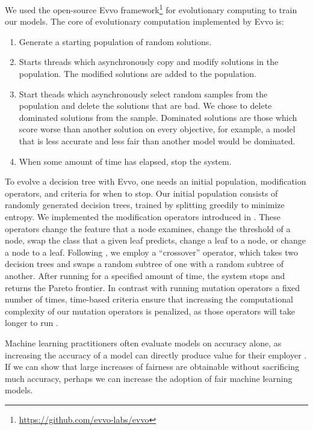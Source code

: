 \documentclass{elsarticle}
\begin{document}
We used the open-source Evvo framework\footnote{\href{https://github.com/evvo-labs/evvo}{https://github.com/evvo-labs/evvo}} for evolutionary computing to train our models. The core of evolutionary computation implemented by Evvo is:
\begin{enumerate}
	\item Generate a starting population of random solutions.
	\item Starts threads which asynchronously copy and modify solutions in the population. The modified solutions are added to the population.
	\item Start theads which asynchronously select random samples from the population and delete the solutions that are bad. We chose to delete dominated solutions from the sample. Dominated solutions are those which score worse than another solution on every objective, for example, a model that is less accurate and less fair than another model would be dominated.
	\item When some amount of time has elapsed, stop the system.
\end{enumerate}
To evolve a decision tree with Evvo, one needs an initial population, modification operators, and criteria for when to stop. Our initial population consists of randomly generated decision trees, trained by splitting greedily to minimize entropy. We implemented the modification operators introduced in \citep{Kretowski:2005}. These operators change the feature that a node examines, change the threshold of a node, swap the class that a given leaf predicts, change a leaf to a node, or change a node to a leaf. Following \citep{Papagelis:2000}, we employ a “crossover” operator, which takes two decision trees and swaps a random subtree of one with a random subtree of another. After running for a specified amount of time, the system stops and returns the Pareto frontier. In contrast with running mutation operators a fixed number of times, time-based criteria ensure that increasing the computational complexity of our mutation operators is penalized, as those operators will take longer to run \citep{Eiben:2015}.

Machine learning practitioners often evaluate models on accuracy alone, as increasing the accuracy of a model can directly produce value for their employer \citep{Packer:2018}. If we can show that large increases of fairness are obtainable without sacrificing much accuracy, perhaps we can increase the adoption of fair machine learning models. 
\end{document}
